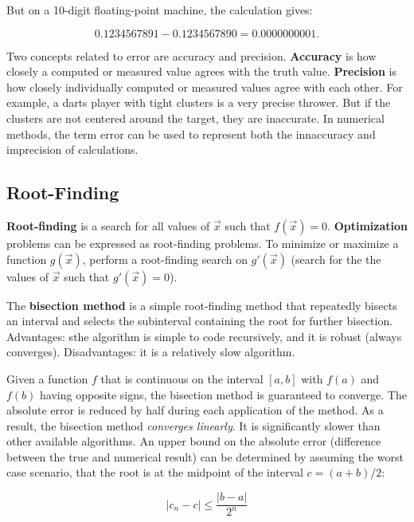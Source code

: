But on a 10-digit floating-point machine, the calculation gives:

\begin{equation}
0.1234567891 - 0.1234567890 = 0.0000000001.
\end{equation}

Two concepts related to error are accuracy and precision. \textbf{Accuracy} is how closely a computed or measured value agrees with the truth value. \textbf{Precision} is how closely individually computed or measured values agree with each other. For example, a darts player with tight clusters is a very precise thrower. But if the clusters are not centered around the target, they are inaccurate. In numerical methods, the term error can be used to represent both the innaccuracy and imprecision of calculations. 

\subsection{Root-Finding}

\textbf{Root-finding} is a search for all values of $\vec{x}$ such that $f(\vec{x})=0$. \textbf{Optimization} problems can be expressed as root-finding problems. To minimize or maximize a function $g(\vec{x})$, perform a root-finding search on $g'(\vec{x})$ (search for the the values of $\vec{x}$ such that $g'(\vec{x})=0$). 

The \textbf{bisection method} is a simple root-finding method that repeatedly bisects an interval and selects the subinterval containing the root for further bisection. Advantages: sthe algorithm is simple to code recursively, and it is robust (always converges). Disadvantages: it is a relatively slow algorithm. 

Given a function $f$ that is continuous on the interval $[a,b]$ with $f(a)$ and $f(b)$ having opposite signs, the bisection method is guaranteed to converge. The absolute error is reduced by half during each application of the method. As a result, the bisection method \textit{converges linearly}. It is significantly slower than other available algorithms. An upper bound on the absolute error (difference between the true and numerical result) can be determined by assuming the worst case scenario, that the root is at the midpoint of the interval $c = (a+b)/2$:

\begin{equation}
|c_{n} - c| \le \frac{|b-a|}{2^{n}}
\end{equation}

